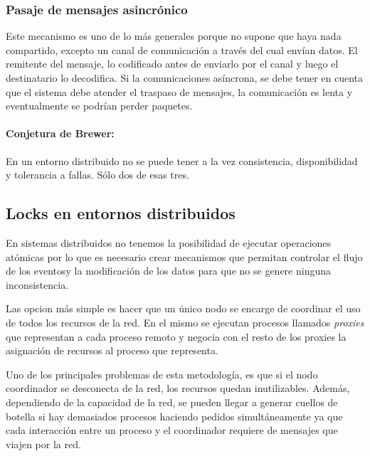 \subsubsection{Pasaje de mensajes asincrónico}
Este mecanismo es uno de lo más generales porque no supone que haya nada compartido, excepto un canal de comunicación a través del cual envían datos. El remitente del mensaje, lo codificado antes de enviarlo por el canal y luego el destinatario lo decodifica. Si la comunicaciones asíncrona, se debe tener en cuenta que el sistema debe atender el traspaso de mensajes, la comunicación es lenta y eventualmente se podrían perder paquetes.

\paragraph{Conjetura de Brewer:} En un entorno distribuido no se puede tener a la vez consistencia, disponibilidad y tolerancia a fallas. Sólo dos de esas tres.

\subsection{Locks en entornos distribuidos}
En sistemas distribuidos no tenemos la posibilidad de ejecutar operaciones atómicas por lo que es necesario crear mecanismos que permitan controlar el flujo de los eventosy la modificación de los datos para que no se genere ninguna inconsistencia.

Las opcion más simple es hacer que un único nodo se encarge de coordinar el uso de todos los recursos de la red. En el mismo se ejecutan procesos llamados \textit{proxies} que representan a cada proceso remoto y negocia con el resto de los proxies la asignación de recursos al proceso que representa.

Uno de los principales problemas de esta metodología, es que si el nodo coordinador se desconecta de la red, los recursos quedan inutilizables. Además, dependiendo de la capacidad de la red, se pueden llegar a generar cuellos de botella si hay demasiados procesos haciendo pedidos simultáneamente ya que cada interacción entre un proceso y el coordinador requiere de mensajes que viajen por la red.

